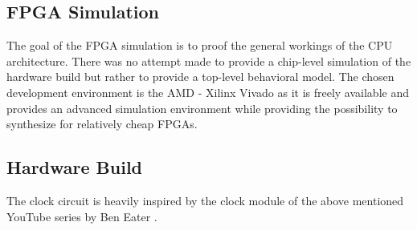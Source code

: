 \subsection{FPGA Simulation}
The goal of the \gls{FPGA} simulation is to proof the general workings of the \gls{CPU} architecture.
There was no attempt made to provide a chip-level simulation of the hardware build but rather to provide a top-level behavioral model.
The chosen development environment is the AMD - Xilinx Vivado \cite{vivado} as it is freely available and provides an advanced simulation environment while providing the possibility to synthesize for relatively cheap \glspl{FPGA}.

\subsection{Hardware Build}

The clock circuit is heavily inspired by the clock module of the above mentioned YouTube series by Ben Eater \cite{eater_clock}.